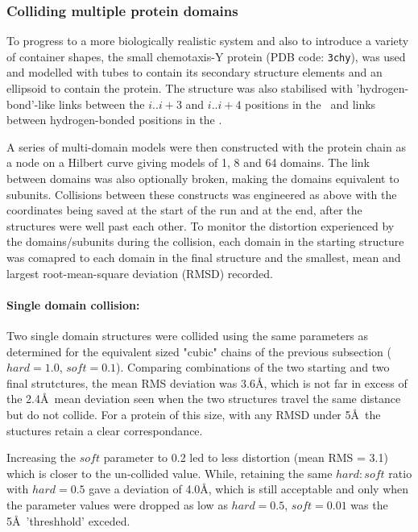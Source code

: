\subsubsection{Colliding multiple protein domains}

To progress to a more biologically realistic system and also to introduce a variety
of container shapes, the small chemotaxis-Y protein (PDB code: {\tt 3chy}), was used
and modelled with tubes to contain its secondary structure elements and an ellipsoid
to contain the protein.    The structure was also stabilised with 'hydrogen-bond'-like
links between the $i..i+3$ and $i..i+4$ positions in the \AHs\ and links between
hydrogen-bonded positions in the \BS.

A series of multi-domain models were then constructed with the protein chain as a
node on a Hilbert curve giving models of 1, 8 and 64 domains.   The link between 
domains was also optionally broken, making the domains equivalent to subunits.
Collisions between these constructs was engineered as above with the coordinates
being saved at the start of the run and at the end, after the structures were well
past each other.    To monitor the distortion experienced by the domains/subunits
during the collision, each domain in the starting structure was comapred to each
domain in the final structure and the smallest, mean and largest root-mean-square
deviation (RMSD) recorded. 

\paragraph{Single domain collision:\\}

Two single domain structures were collided using the same parameters as determined
for the equivalent sized "cubic" chains of the previous subsection ($hard = 1.0$, $soft = 0.1$).
Comparing combinations of the two starting and two final strutctures, the mean RMS
deviation was 3.6\AA , which is not far in excess of the 2.4\AA\ mean deviation seen
when the two structures travel the same distance but do not collide.   For a protein
of this size, with any RMSD under 5\AA\ the stuctures retain a clear correspondance. 

Increasing the $soft$ parameter to 0.2 led to less distortion (mean RMS = 3.1) which
is closer to the un-collided value.   While, retaining the same $hard:soft$ ratio
with $hard = 0.5$ gave a deviation of 4.0\AA, which is still acceptable and only
when the parameter values were dropped as low as $hard = 0.5$, $soft = 0.01$ was the
5\AA\ 'threshhold' exceded.  

